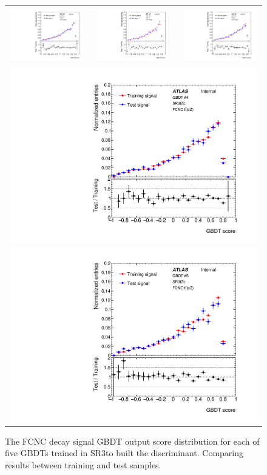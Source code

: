 \begin{figure}[htbp]
	\centering
	\begin{tabular}{ccc}
		\includegraphics[width=.3\textwidth]{Chapters/CH5/figures/SR3_UsingSMT/BDT/GBDT_signal_Fold1} &
		\includegraphics[width=.3\textwidth]{Chapters/CH5/figures/SR3_UsingSMT/BDT/GBDT_signal_Fold2} &
		\includegraphics[width=.3\textwidth]{Chapters/CH5/figures/SR3_UsingSMT/BDT/GBDT_signal_Fold3} \\ 
		\multicolumn{3}{c}{
			\includegraphics[width=.3\textwidth]{Chapters/CH5/figures/SR3_UsingSMT/BDT/GBDT_signal_Fold4}
			\includegraphics[width=.3\textwidth]{Chapters/CH5/figures/SR3_UsingSMT/BDT/GBDT_signal_Fold5}} \\
	\end{tabular}
	\caption{ The FCNC \tZc \ttbar decay signal GBDT output score distribution for each of five GBDTs trained in SR3\tZc to built the \Dthree discriminant. 
		Comparing results between training and test samples.
	}%
	\label{fig:separation:SR3:GBDTsig}
\end{figure}

